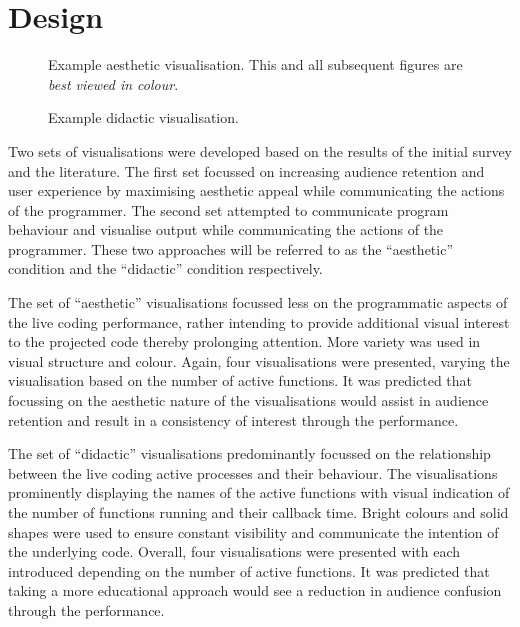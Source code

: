 \documentclass{sig-alternate}
\begin{document}
\section{Design}

\begin{figure}
\centering
{}
\caption{Example aesthetic visualisation. This and all subsequent figures are {\it best viewed in colour}.}
\label{fig:aesthetic-visualisation}
\end{figure}

\begin{figure}
\centering
{}
\caption{Example didactic visualisation.}
\label{fig:didactic-visualisation}
\end{figure}

Two sets of visualisations were developed based on the results of the initial survey and the literature. The first set focussed on increasing audience retention and user experience by maximising aesthetic appeal \cite{Cawthon2007} while communicating the actions of the programmer. The second set attempted to communicate program behaviour and visualise output while communicating the actions of the programmer. These two approaches will be referred to as the ``aesthetic'' condition and the ``didactic'' condition respectively.

The set of ``aesthetic'' visualisations focussed less on the programmatic aspects of the live coding performance, rather intending to provide additional visual interest to the projected code thereby prolonging attention. More variety was used in visual structure and colour. Again, four visualisations were presented, varying the visualisation based on the number of active functions. It was predicted that focussing on the aesthetic nature of the visualisations would assist in audience retention and result in a consistency of interest through the performance.

The set of ``didactic'' visualisations predominantly focussed on the relationship between the live coding active processes and their behaviour. The visualisations prominently displaying the names of the active functions with visual indication of the number of functions running and their callback time. Bright colours and solid shapes were used to ensure constant visibility and communicate the intention of the underlying code. Overall, four visualisations were presented with each introduced depending on the number of active functions. It was predicted that taking a more educational approach would see a reduction in audience confusion through the performance.
\end{document}

